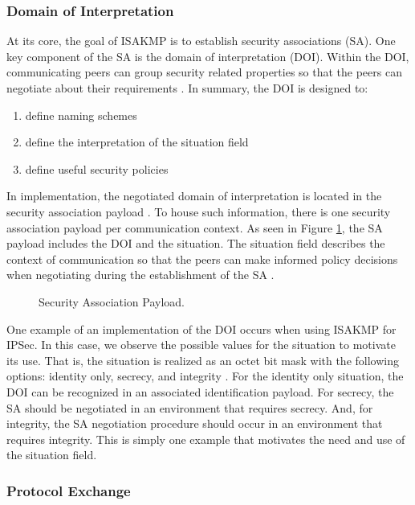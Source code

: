 \documentclass[12pt, letterpaper, twoside]{article}
\newcommand{\squash}{\itemsep=0pt\parskip=0pt}
\begin{document}
\newpage
\subsubsection{Domain of Interpretation}

At its core, the goal of ISAKMP is to establish security associations (SA). One key component of the SA is the domain of interpretation (DOI). Within the DOI, communicating peers can group security related properties so that the peers can negotiate about their requirements \cite{rfc_doi}. In summary, the DOI is designed to:

\begin{enumerate}
    \squash
    \item define naming schemes 
    \item define the interpretation of the situation field 
    \item define useful security policies 
\end{enumerate}

In implementation, the negotiated domain of interpretation is located in the security association payload \cite{ISAKMP}. To house such information, there is one security association payload per communication context. As seen in Figure \ref{fig:SA_pay}, the SA payload includes the DOI and the situation. The situation field describes the context of communication so that the peers can make informed policy decisions when negotiating during the establishment of the SA \cite{rfc_doi}. 

\begin{figure}[hbtp]
\centering
  
  \caption{Security Association Payload. \cite{ISAKMP}}
  \label{fig:SA_pay}
\end{figure}

One example of an implementation of the DOI occurs when using ISAKMP for IPSec. In this case, we observe the possible values for the situation to motivate its use. That is, the situation is realized as an octet bit mask with the following options: identity only, secrecy, and integrity \cite{rfc_doi}. For the identity only situation, the DOI can be recognized in an associated identification payload. For secrecy, the SA should be negotiated in an environment that requires secrecy. And, for integrity, the SA negotiation procedure should occur in an environment that requires integrity. This is simply one example that motivates the need and use of the situation field.

\subsubsection{Protocol Exchange}
\end{document}
